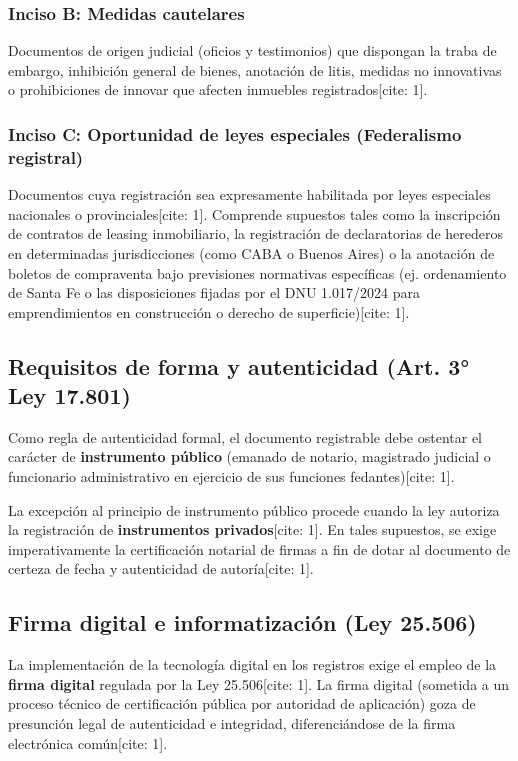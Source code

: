 \documentclass[12pt,oneside]{book}
\begin{document}
\subsubsection{Inciso B: Medidas cautelares}
Documentos de origen judicial (oficios y testimonios) que dispongan la traba de embargo, inhibición general de bienes, anotación de litis, medidas no innovativas o prohibiciones de innovar que afecten inmuebles registrados[cite: 1].

\subsubsection{Inciso C: Oportunidad de leyes especiales (Federalismo registral)}
Documentos cuya registración sea expresamente habilitada por leyes especiales nacionales o provinciales[cite: 1]. Comprende supuestos tales como la inscripción de contratos de leasing inmobiliario, la registración de declaratorias de herederos en determinadas jurisdicciones (como CABA o Buenos Aires) o la anotación de boletos de compraventa bajo previsiones normativas específicas (ej. ordenamiento de Santa Fe o las disposiciones fijadas por el DNU 1.017/2024 para emprendimientos en construcción o derecho de superficie)[cite: 1].

\subsection{Requisitos de forma y autenticidad (Art. 3° Ley 17.801)}

Como regla de autenticidad formal, el documento registrable debe ostentar el carácter de \textbf{instrumento público} (emanado de notario, magistrado judicial o funcionario administrativo en ejercicio de sus funciones fedantes)[cite: 1].

\begin{note}
La excepción al principio de instrumento público procede cuando la ley autoriza la registración de \textbf{instrumentos privados}[cite: 1]. En tales supuestos, se exige imperativamente la certificación notarial de firmas a fin de dotar al documento de certeza de fecha y autenticidad de autoría[cite: 1].
\end{note}

\subsection{Firma digital e informatización (Ley 25.506)}

La implementación de la tecnología digital en los registros exige el empleo de la \textbf{firma digital} regulada por la Ley 25.506[cite: 1]. La firma digital (sometida a un proceso técnico de certificación pública por autoridad de aplicación) goza de presunción legal de autenticidad e integridad, diferenciándose de la firma electrónica común[cite: 1].
\end{document}
